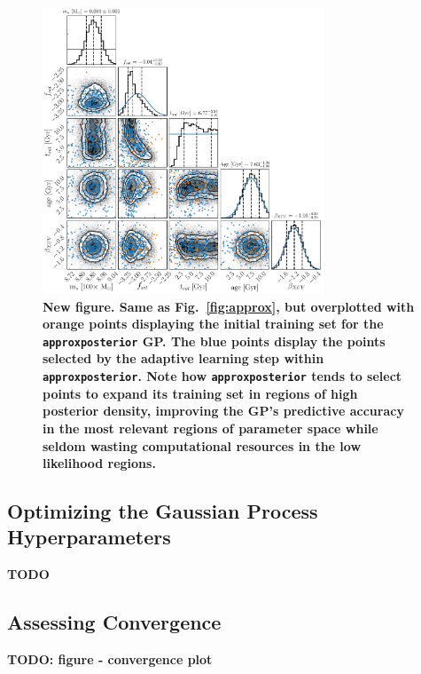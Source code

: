 \documentclass[twocolumn]{aastex62}
\newcommand{\xxx}[1]{{\textbf{#1}}}
\newcommand{\approxposterior}[0]{\texttt{approxposterior}\xspace}
\begin{document}
\begin{figure}[t]
\centering
	\includegraphics[width=0.75\textwidth]{../Analysis/Validation/points.pdf}
   \caption{\xxx{New figure. Same as Fig.~\ref{fig:approx}, but overplotted with orange points displaying the initial training set for the \approxposterior GP. The blue points display the points selected by the adaptive learning step within \approxposterior. Note how \approxposterior tends to select points to expand its training set in regions of high posterior density, improving the GP's predictive accuracy in the most relevant regions of parameter space while seldom wasting computational resources in the low likelihood regions.}}%
    \label{fig:points}%
\end{figure}

\subsection{Optimizing the Gaussian Process Hyperparameters} \label{sec:app:gp}

\xxx{TODO}

\subsection{Assessing Convergence} \label{sec:app:convergence}

\xxx{TODO: figure - convergence plot}
\end{document}
